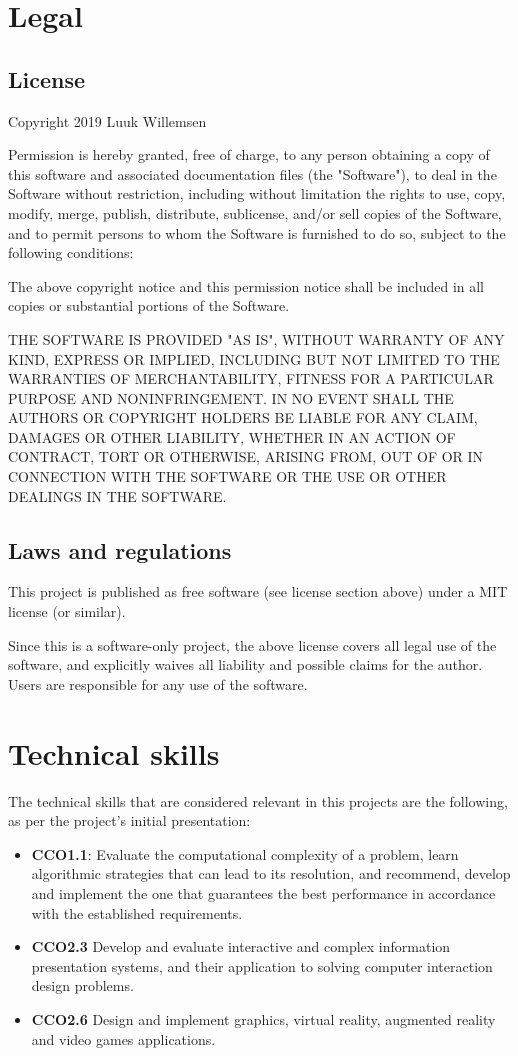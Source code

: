 \break
\section{Legal}
\subsection{License}
Copyright 2019 Luuk Willemsen

Permission is hereby granted, free of charge, to any person obtaining a copy of this software and associated documentation files (the "Software"), to deal in the Software without restriction, including without limitation the rights to use, copy, modify, merge, publish, distribute, sublicense, and/or sell copies of the Software, and to permit persons to whom the Software is furnished to do so, subject to the following conditions:

The above copyright notice and this permission notice shall be included in all copies or substantial portions of the Software.

THE SOFTWARE IS PROVIDED "AS IS", WITHOUT WARRANTY OF ANY KIND, EXPRESS OR IMPLIED, INCLUDING BUT NOT LIMITED TO THE WARRANTIES OF MERCHANTABILITY, FITNESS FOR A PARTICULAR PURPOSE AND NONINFRINGEMENT. IN NO EVENT SHALL THE AUTHORS OR COPYRIGHT HOLDERS BE LIABLE FOR ANY CLAIM, DAMAGES OR OTHER LIABILITY, WHETHER IN AN ACTION OF CONTRACT, TORT OR OTHERWISE, ARISING FROM, OUT OF OR IN CONNECTION WITH THE SOFTWARE OR THE USE OR OTHER DEALINGS IN THE SOFTWARE.

\subsection{Laws and regulations}
This project is published as free software (see license section above) under a MIT license (or similar).

Since this is a software-only project, the above license covers all legal use of the software, and explicitly waives all liability and possible claims for the author. Users are responsible for any use of the software.


\section{Technical skills}
The technical skills that are considered relevant in this projects are the following, as per the project's initial presentation:

\begin{itemize}
    \item \textbf{CCO1.1}: 
    Evaluate the computational complexity of a problem, learn algorithmic strategies that can lead to its resolution, and recommend, develop and implement the one that guarantees the best performance in accordance with the established requirements. 
    \item \textbf{CCO2.3} Develop and evaluate interactive and complex information presentation systems, and their application to solving computer interaction design problems.
    \item \textbf{CCO2.6} Design and implement graphics, virtual reality, augmented reality and video games applications.
\end{itemize}

